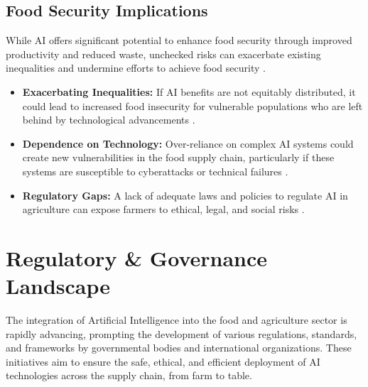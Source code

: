 \subsection{Food Security Implications}
While AI offers significant potential to enhance food security through improved productivity and reduced waste, unchecked risks can exacerbate existing inequalities and undermine efforts to achieve food security \cite{ITU_FoodSecurity}.
\begin{itemize}
    \item \textbf{Exacerbating Inequalities:} If AI benefits are not equitably distributed, it could lead to increased food insecurity for vulnerable populations who are left behind by technological advancements \cite{UNU_FoodSecurity}.
    \item \textbf{Dependence on Technology:} Over-reliance on complex AI systems could create new vulnerabilities in the food supply chain, particularly if these systems are susceptible to cyberattacks or technical failures \cite{FastCompany_FoodSecurity}.
\item \textbf{Regulatory Gaps:} A lack of adequate laws and policies to regulate AI in agriculture can expose farmers to ethical, legal, and social risks \cite{JumpstartMag_SmallFarmers}.
\end{itemize}

\section{Regulatory \& Governance Landscape}

The integration of Artificial Intelligence into the food and agriculture sector is rapidly advancing, prompting the development of various regulations, standards, and frameworks by governmental bodies and international organizations. These initiatives aim to ensure the safe, ethical, and efficient deployment of AI technologies across the supply chain, from farm to table.

